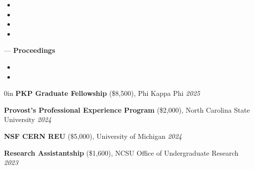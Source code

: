 \documentclass{cv}
\begin{document}

\vspace{0.3em}
\vspace{-0.6em}

\begin{itemize}[leftmargin=1.3em]
    \setlength\itemsep{-0.1em}
    \item {}
    \item {}
    \item {}
    \item {}
\end{itemize}

\vspace{-0.3em}
{\large--- {\bfseries Proceedings}}
\vspace{-0.6em}

\begin{itemize}[leftmargin=1.3em]
    \setlength\itemsep{-0.1em}
    \item {}
    \item {}
\end{itemize}
\vspace{-0.3em}



\vspace{0.3em}


\begin{adjustwidth}{\spacing}{0in}
    \textbf{PKP Graduate Fellowship} (\$8,500),
    Phi Kappa Phi
    \hfill \textsl{2025}

    \textbf{Provost's Professional Experience Program} (\$2,000),
    North Carolina State University
    \hfill \textsl{2024}

    \textbf{NSF CERN REU} (\$5,000),
    University of Michigan
    \hfill \textsl{2024}

    \textbf{Research Assistantship} (\$1,600),
    NCSU Office of Undergraduate Research
    \hfill \textsl{2023}
\end{adjustwidth}
\vspace{0.6em}


\vspace{0.2em}

\vspace{0.6em}
\end{document}
